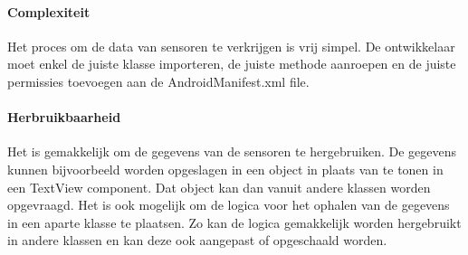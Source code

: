 \paragraph{Complexiteit}
Het proces om de data van sensoren te verkrijgen is vrij simpel. De ontwikkelaar moet enkel de juiste klasse importeren, 
de juiste methode aanroepen en de juiste permissies toevoegen aan de AndroidManifest.xml file.

\paragraph{Herbruikbaarheid}
Het is gemakkelijk om de gegevens van de sensoren te hergebruiken. De gegevens kunnen bijvoorbeeld 
worden opgeslagen in een object in plaats van te tonen in een TextView component. Dat object kan dan vanuit 
andere klassen worden opgevraagd. Het is ook mogelijk om de logica voor het ophalen van de gegevens
in een aparte klasse te plaatsen. Zo kan de logica gemakkelijk worden hergebruikt in andere klassen en 
kan deze ook aangepast of opgeschaald worden.
